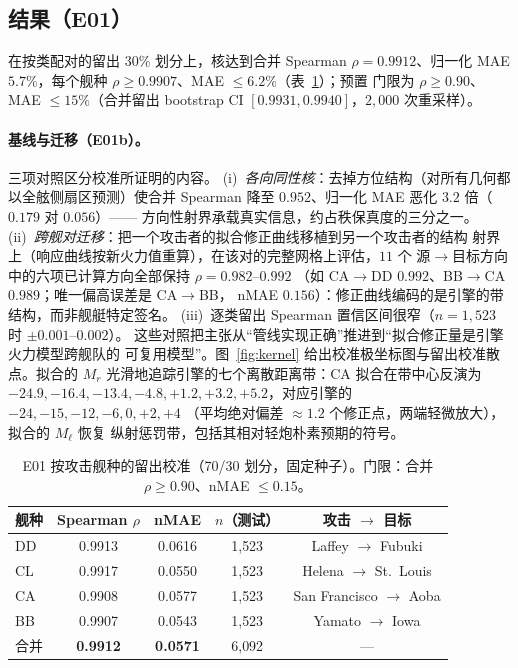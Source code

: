 \documentclass[12pt,a4paper]{ctexart}
\begin{document}
\subsection{结果（E01）}
在按类配对的留出 30\% 划分上，核达到合并 Spearman $\rho=0.9912$、归一化 MAE
$5.7\%$，每个舰种 $\rho\ge0.9907$、MAE $\le6.2\%$（表~\ref{tab:e01}）；预置
门限为 $\rho\ge0.90$、MAE $\le15\%$（合并留出 bootstrap CI
$[0.9931, 0.9940]$，$2{,}000$ 次重采样）。

\paragraph{基线与迁移（E01b）。} 三项对照区分校准所证明的内容。
(i)~\emph{各向同性核}：去掉方位结构（对所有几何都以全舷侧扇区预测）使合并
Spearman 降至 $0.952$、归一化 MAE 恶化 $3.2$ 倍（$0.179$ 对 $0.056$）——
方向性射界承载真实信息，约占秩保真度的三分之一。
(ii)~\emph{跨舰对迁移}：把一个攻击者的拟合修正曲线移植到另一个攻击者的结构
射界上（响应曲线按新火力值重算），在该对的完整网格上评估，$11$ 个
源$\to$目标方向中的六项已计算方向全部保持 $\rho = 0.982$--$0.992$
（如 CA$\to$DD $0.992$、BB$\to$CA $0.989$；唯一偏高误差是 CA$\to$BB，
nMAE $0.156$）：修正曲线编码的是引擎的带结构，而非舰艇特定签名。
(iii)~逐类留出 Spearman 置信区间很窄（$n{=}1{,}523$ 时 $\pm0.001$--$0.002$）。
这些对照把主张从``管线实现正确''推进到``拟合修正量是引擎火力模型跨舰队的
可复用模型''。图~\ref{fig:kernel} 给出校准极坐标图与留出校准散点。拟合的
$M_r$ 光滑地追踪引擎的七个离散距离带：CA 拟合在带中心反演为 $-24.9, -16.4,
-13.4, -4.8, +1.2, +3.2, +5.2$，对应引擎的 $-24, -15, -12, -6, 0, +2, +4$
（平均绝对偏差 $\approx1.2$ 个修正点，两端轻微放大），拟合的 $M_\ell$ 恢复
纵射惩罚带，包括其相对轻炮朴素预期的符号。

\begin{table}[!htb]
\centering\small
\caption{E01 按攻击舰种的留出校准（70/30 划分，固定种子）。门限：合并
$\rho\ge0.90$、nMAE $\le0.15$。}
\label{tab:e01}
\begin{tabular}{lcccc}
\toprule
舰种 & Spearman $\rho$ & nMAE & $n$（测试） & 攻击 $\to$ 目标 \\
\midrule
DD & 0.9913 & 0.0616 & 1{,}523 & Laffey $\to$ Fubuki \\
CL & 0.9917 & 0.0550 & 1{,}523 & Helena $\to$ St.\ Louis \\
CA & 0.9908 & 0.0577 & 1{,}523 & San Francisco $\to$ Aoba \\
BB & 0.9907 & 0.0543 & 1{,}523 & Yamato $\to$ Iowa \\
\midrule
合并 & \textbf{0.9912} & \textbf{0.0571} & 6{,}092 & --- \\
\bottomrule
\end{tabular}
\end{table}
\end{document}
